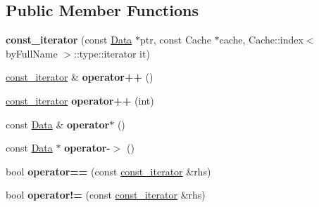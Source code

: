 \subsection*{Public Member Functions}
\begin{DoxyCompactItemize}
\item 
{\bfseries const\+\_\+iterator} (const \hyperlink{classndn_1_1Data}{Data} $\ast$ptr, const Cache $\ast$cache, Cache\+::index$<$ by\+Full\+Name $>$\+::type\+::iterator it)\hypertarget{classndn_1_1util_1_1InMemoryStorage_1_1const__iterator_ab1757d7c1f6b4d37e4a9cceed44683a8}{}\label{classndn_1_1util_1_1InMemoryStorage_1_1const__iterator_ab1757d7c1f6b4d37e4a9cceed44683a8}

\item 
\hyperlink{classndn_1_1util_1_1InMemoryStorage_1_1const__iterator}{const\+\_\+iterator} \& {\bfseries operator++} ()\hypertarget{classndn_1_1util_1_1InMemoryStorage_1_1const__iterator_abd37777d896a1064f8edf8e9cc3b6fab}{}\label{classndn_1_1util_1_1InMemoryStorage_1_1const__iterator_abd37777d896a1064f8edf8e9cc3b6fab}

\item 
\hyperlink{classndn_1_1util_1_1InMemoryStorage_1_1const__iterator}{const\+\_\+iterator} {\bfseries operator++} (int)\hypertarget{classndn_1_1util_1_1InMemoryStorage_1_1const__iterator_adc75618916b416dc5df4621c44d8b3b7}{}\label{classndn_1_1util_1_1InMemoryStorage_1_1const__iterator_adc75618916b416dc5df4621c44d8b3b7}

\item 
const \hyperlink{classndn_1_1Data}{Data} \& {\bfseries operator$\ast$} ()\hypertarget{classndn_1_1util_1_1InMemoryStorage_1_1const__iterator_a387b399724c8c374d9ac492024f01c25}{}\label{classndn_1_1util_1_1InMemoryStorage_1_1const__iterator_a387b399724c8c374d9ac492024f01c25}

\item 
const \hyperlink{classndn_1_1Data}{Data} $\ast$ {\bfseries operator-\/$>$} ()\hypertarget{classndn_1_1util_1_1InMemoryStorage_1_1const__iterator_acc40d8641d84e888c3b59d8ae781c3ae}{}\label{classndn_1_1util_1_1InMemoryStorage_1_1const__iterator_acc40d8641d84e888c3b59d8ae781c3ae}

\item 
bool {\bfseries operator==} (const \hyperlink{classndn_1_1util_1_1InMemoryStorage_1_1const__iterator}{const\+\_\+iterator} \&rhs)\hypertarget{classndn_1_1util_1_1InMemoryStorage_1_1const__iterator_a10955419382104d309a602864251da44}{}\label{classndn_1_1util_1_1InMemoryStorage_1_1const__iterator_a10955419382104d309a602864251da44}

\item 
bool {\bfseries operator!=} (const \hyperlink{classndn_1_1util_1_1InMemoryStorage_1_1const__iterator}{const\+\_\+iterator} \&rhs)\hypertarget{classndn_1_1util_1_1InMemoryStorage_1_1const__iterator_abe4cd3e0d845c803e659bd2ab24a5b43}{}\label{classndn_1_1util_1_1InMemoryStorage_1_1const__iterator_abe4cd3e0d845c803e659bd2ab24a5b43}

\end{DoxyCompactItemize}



